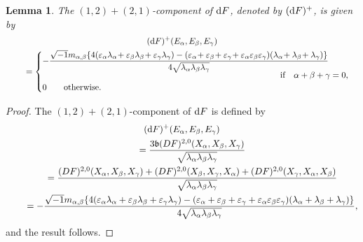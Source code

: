 \documentclass[pdftex]{sigma}%
\numberwithin{equation}{section}
\newtheorem{Lemma}[Theorem]{Lemma}
\begin{document}
\begin{Lemma}
The $(1,2)+(2,1)$-component of ${\rm d}F$, denoted by $({\rm d}F)^{+}$, is given by
\begin{gather*}
({\rm d}F)^{+}(E_{\alpha},E_{\beta},E_{\gamma})
\\ \qquad
{}=\begin{cases}
-\dfrac{\sqrt{-1} m_{\alpha,\beta}\{4(\varepsilon_{\alpha}\lambda_{\alpha} \!+\varepsilon_{\beta}\lambda_{\beta}\!+\varepsilon_{\gamma}\lambda_{\gamma}) -(\varepsilon_{\alpha}\!+\varepsilon_{\beta}\!+\varepsilon_{\gamma} \!+\varepsilon_{\alpha}\varepsilon_{\beta}\varepsilon_{\gamma})(\lambda_{\alpha}\!+\lambda_{\beta} \!+\lambda_{\gamma})\}}{4\sqrt{\lambda_{\alpha}\lambda_{\beta}\lambda_{\gamma}}}
\\[-1ex]
\hspace{98mm}\text{if} \quad \alpha+\beta+\gamma = 0,
\\
0 \qquad \text{otherwise.}
\end{cases}
\end{gather*}
\end{Lemma}
\begin{proof}
 The $(1,2)+(2,1)$-component of ${\rm d}F$ is defined by
\begin{gather*}
({\rm d}F)^{+}(E_{\alpha},E_{\beta},E_{\gamma})
\\ \qquad
{}=\dfrac{3\mathfrak{b}(DF)^{2,0}(X_{\alpha},X_{\beta},X_{\gamma})} {\sqrt{\lambda_{\alpha}\lambda_{\beta}\lambda_{\gamma}}}
\\ \qquad
{}=\dfrac{(DF)^{2,0}(X_{\alpha},X_{\beta},X_{\gamma})+(DF)^{2,0}(X_{\beta},X_{\gamma},X_{\alpha}) +(DF)^{2,0}(X_{\gamma},X_{\alpha},X_{\beta})}{\sqrt{\lambda_{\alpha}\lambda_{\beta}\lambda_{\gamma}}}
\\ \qquad
{}=-\dfrac{\sqrt{-1} m_{\alpha,\beta}\{4(\varepsilon_{\alpha}\lambda_{\alpha} +\varepsilon_{\beta}\lambda_{\beta}+\varepsilon_{\gamma}\lambda_{\gamma}) -(\varepsilon_{\alpha}+\varepsilon_{\beta}+\varepsilon_{\gamma} +\varepsilon_{\alpha}\varepsilon_{\beta}\varepsilon_{\gamma}) (\lambda_{\alpha}+\lambda_{\beta}+\lambda_{\gamma})\}} {4\sqrt{\lambda_{\alpha}\lambda_{\beta}\lambda_{\gamma}}},
\end{gather*}
and the result follows.
\end{proof}
\end{document}
